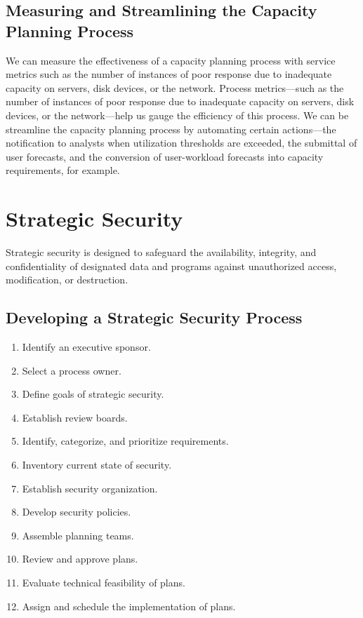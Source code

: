 \documentclass[a4]{article}
\begin{document}
\begin{multicols}{3}
\subsection{Measuring and Streamlining the Capacity Planning Process}
We can measure the effectiveness of a capacity planning process with service metrics such as the number of instances of 
poor response due to inadequate capacity on servers, disk devices, or the network. 
Process metrics—such as the number of instances of poor response due to inadequate capacity on servers, disk devices, 
or the network—help us gauge the efficiency of this process. 
We can be streamline the capacity planning process by automating certain actions—the notification to analysts when 
utilization thresholds are exceeded, the submittal of user forecasts, and the conversion of user-workload forecasts 
into capacity requirements, for example.

\section{Strategic Security}
Strategic security is designed to safeguard the availability, integrity, and confidentiality of designated data
 and programs against unauthorized access, modification, or destruction.

\subsection{Developing a Strategic Security Process}
\begin{enumerate}
    \item Identify an executive sponsor.
    \item Select a process owner.
    \item Define goals of strategic security.
    \item Establish review boards.
    \item Identify, categorize, and prioritize requirements.
    \item Inventory current state of security.
    \item Establish security organization.
    \item Develop security policies.
    \item Assemble planning teams.
    \item Review and approve plans.
    \item Evaluate technical feasibility of plans.
    \item Assign and schedule the implementation of plans.
\end{enumerate}


\end{multicols}
\end{document}
